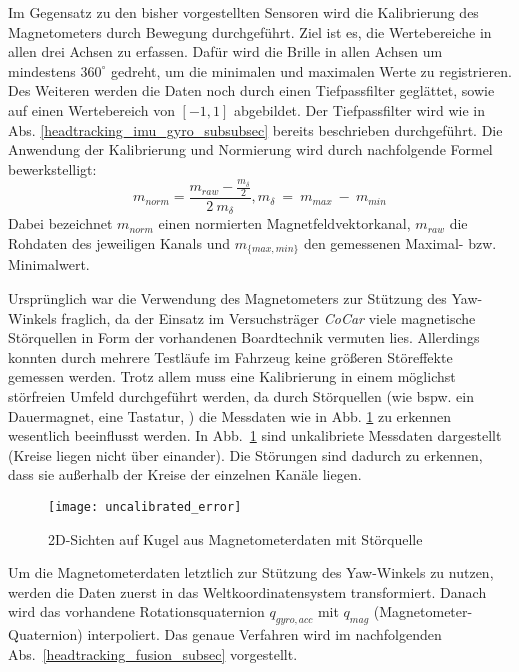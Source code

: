 Im Gegensatz zu den bisher vorgestellten Sensoren wird die Kalibrierung des Magnetometers durch Bewegung durchgeführt.
Ziel ist es, die Wertebereiche in allen drei Achsen zu erfassen.
Dafür wird die Brille in allen Achsen um mindestens $360^\circ$ gedreht, um die minimalen und maximalen Werte zu registrieren. 
Des Weiteren werden die Daten noch durch einen Tiefpassfilter geglättet, sowie auf einen Wertebereich von $[-1,1]$ abgebildet.
Der Tiefpassfilter wird wie in Abs. \ref{headtracking_imu_gyro_subsubsec} bereits beschrieben durchgeführt. 
Die Anwendung der Kalibrierung und Normierung wird durch nachfolgende Formel bewerkstelligt:
\begin{equation}
    m_{norm} = \frac{m_{raw}- \frac{m_{\delta}}{2}}{2~m_{\delta}},  m_{\delta}~=~m_{max}~-~m_{min}
\end{equation}
Dabei bezeichnet $m_{norm}$ einen normierten Magnetfeldvektorkanal, $m_{raw}$ die Rohdaten des jeweiligen Kanals und $m_{\lbrace max, min\rbrace}$ den gemessenen Maximal- bzw. Minimalwert.

Ursprünglich war die Verwendung des Magnetometers zur Stützung des Yaw-Winkels fraglich, da der Einsatz im Versuchsträger \emph{CoCar} viele magnetische Störquellen in Form der vorhandenen Boardtechnik vermuten lies. 
Allerdings konnten durch mehrere Testläufe im Fahrzeug keine größeren Störeffekte gemessen werden. Trotz allem muss eine Kalibrierung in einem möglichst störfreien Umfeld durchgeführt werden, da durch Störquellen (wie bspw. ein Dauermagnet, eine Tastatur, \oae) die Messdaten wie in Abb. \ref{fig:uncalibrated_error} zu erkennen wesentlich beeinflusst werden. In Abb.~\ref{fig:uncalibrated_error} sind unkalibriete Messdaten dargestellt (Kreise liegen nicht über einander). Die Störungen sind dadurch zu erkennen, dass sie außerhalb der Kreise der einzelnen Kanäle liegen.

\begin{figure}[ht]
	\centering
    \texttt{[image: uncalibrated\_error]}
	\caption[]{2D-Sichten auf Kugel aus Magnetometerdaten mit Störquelle}
	\label{fig:uncalibrated_error}
\end{figure}

Um die Magnetometerdaten letztlich zur Stützung des Yaw-Winkels zu nutzen, werden die Daten zuerst in das Weltkoordinatensystem transformiert.
Danach wird das vorhandene Rotationsquaternion $q_{gyro,acc}$ mit $q_{mag}$ (Magnetometer-Quaternion) interpoliert.
Das genaue Verfahren wird im nachfolgenden Abs.~\ref{headtracking_fusion_subsec} vorgestellt.
